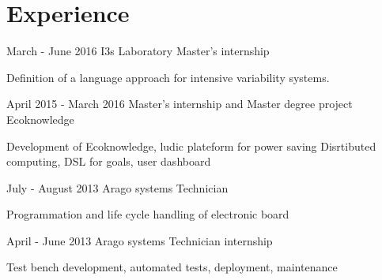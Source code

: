 \section{Experience}

\begin{eventlist}

\item{March - June 2016}
     {I3s Laboratory}
     {Master's internship}

     Definition of a language approach for intensive variability systems.

\item{April 2015 - March 2016}
     {Master's internship and Master degree project}
     {Ecoknowledge}
     
     Development of Ecoknowledge, ludic plateform for power saving
     Disrtibuted computing, DSL for goals, user dashboard


\item{July - August 2013}
     {Arago systems}
     {Technician}
     
     Programmation and life cycle handling of electronic board

     
 \item{April - June 2013}
     {Arago systems}
     {Technician internship}
     
Test bench development, automated tests, deployment, maintenance

     
\end{eventlist}
